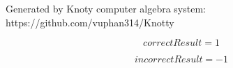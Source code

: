 \documentclass[letterpaper, 10pt]{extarticle}
\begin{document}
Generated by Knoty computer algebra system:
https://github.com/vuphan314/Knotty

\bigskip

\begin{dmath*}
correctResult =
    1
\end{dmath*}


\begin{dmath*}
incorrectResult =
    -1
\end{dmath*}
\end{document}
